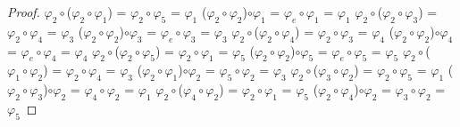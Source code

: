 \documentclass[10pt,a4paper,oneside]{article}
\begin{document}
\begin{proof}
				\newline
				$\varphi_{2}\circ$($\varphi_{2}\circ\varphi_{1}$) = $\varphi_{2}\circ\varphi_{5}$ = $\varphi_{1}$
				\newline
				($\varphi_{2}\circ\varphi_{2}$)$\circ\varphi_{1}$ = $\varphi_{e}\circ\varphi_{1}$ = $\varphi_{1}$
				\newline
				\newline
				$\varphi_{2}\circ$($\varphi_{2}\circ\varphi_{3}$) = $\varphi_{2}\circ\varphi_{4}$ = $\varphi_{3}$
				\newline
				($\varphi_{2}\circ\varphi_{2}$)$\circ\varphi_{3}$ = $\varphi_{e}\circ\varphi_{3}$ = $\varphi_{3}$
				\newline
				\newline
				$\varphi_{2}\circ$($\varphi_{2}\circ\varphi_{4}$) = $\varphi_{2}\circ\varphi_{3}$ = $\varphi_{4}$
				\newline
				($\varphi_{2}\circ\varphi_{2}$)$\circ\varphi_{4}$ = $\varphi_{e}\circ\varphi_{4}$ = $\varphi_{4}$
				\newline
				\newline
				$\varphi_{2}\circ$($\varphi_{2}\circ\varphi_{5}$) = $\varphi_{2}\circ\varphi_{1}$ = $\varphi_{5}$
				\newline
				($\varphi_{2}\circ\varphi_{2}$)$\circ\varphi_{5}$ = $\varphi_{e}\circ\varphi_{5}$ = $\varphi_{5}$
				\newline
				\newline
				$\varphi_{2}\circ$($\varphi_{1}\circ\varphi_{2}$) = $\varphi_{2}\circ\varphi_{4}$ = $\varphi_{3}$
				\newline
				($\varphi_{2}\circ\varphi_{1}$)$\circ\varphi_{2}$ = $\varphi_{5}\circ\varphi_{2}$ = $\varphi_{3}$
				\newline
				\newline
				$\varphi_{2}\circ$($\varphi_{3}\circ\varphi_{2}$) = $\varphi_{2}\circ\varphi_{5}$ = $\varphi_{1}$
				\newline
				($\varphi_{2}\circ\varphi_{3}$)$\circ\varphi_{2}$ = $\varphi_{4}\circ\varphi_{2}$ = $\varphi_{1}$
				\newline
				\newline
				$\varphi_{2}\circ$($\varphi_{4}\circ\varphi_{2}$) = $\varphi_{2}\circ\varphi_{1}$ = $\varphi_{5}$
				\newline
				($\varphi_{2}\circ\varphi_{4}$)$\circ\varphi_{2}$ = $\varphi_{3}\circ\varphi_{2}$ = $\varphi_{5}$
				\newline
				\newline

\end{proof}
\end{document}
